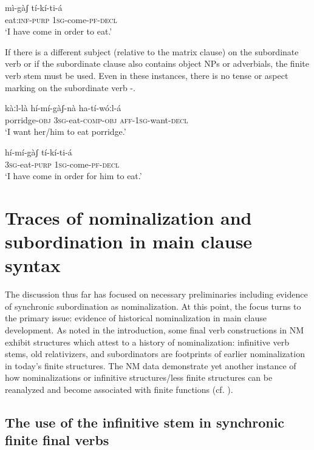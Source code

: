 \documentclass[output=paper]{langsci/langscibook}
\begin{document}
\ea\label{ex:mahland:49}
\gll mì-gàʃ            tí-kí-ti-á\\
eat:\textsc{inf-purp}   \textsc{1sg}{}-come\textsc{{}-pf-decl} \\
\glt `I have come in order to eat.'
\z

If there is a different subject (relative to the matrix clause) on the subordinate verb or if the subordinate clause also contains object NPs or adverbials, the finite verb stem must be used. Even in these instances, there is no tense or aspect marking on the subordinate verb -.

\ea\label{ex:mahland:50}
\gll kàːl-là            hí-mí-gàʃ-nà           ha-tí-wóːl-{\downstep}á  \\
porridge-\textsc{obj}   \textsc{3sg-}eat-\textsc{comp-obj}   \textsc{aff-1sg-}want-\textsc{decl}  \\
\glt `I want her/him to eat porridge.'
\z

\ea\label{ex:mahland:51}
\gll hí-mí-gàʃ          tí-kí-ti-á\\
\textsc{3sg}{}-eat-\textsc{purp}   \textsc{1sg}{}-come-\textsc{pf-decl} \\
\glt `I have come in order for him to eat.'
\z

\section{Traces of nominalization and subordination in main clause syntax}\label{sec:mahland:3}

The discussion thus far has focused on necessary preliminaries including evidence of synchronic subordination as nominalization. At this point, the focus turns to the primary issue: evidence of historical nominalization in main clause development. As noted in the introduction, some final verb constructions in NM exhibit structures which attest to a history of nominalization: infinitive verb stems, old relativizers, and subordinators are footprints of earlier nominalization in today's finite structures. The NM data demonstrate yet another instance of how nominalizations or infinitive structures/less finite structures can be reanalyzed and become associated with finite functions (cf. \citealt{Givon2009, DeLancey2011}).


\subsection{The use of the infinitive stem in synchronic finite final verbs}\label{sec:mahland:3.1}
\end{document}
